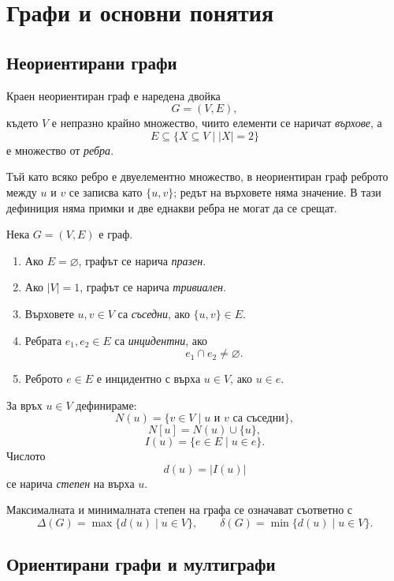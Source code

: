 \section{Графи и основни понятия}\label{s:3.2}

\subsection{Неориентирани графи}\label{s:3.2.1}

\begin{defn}
Краен неориентиран граф е наредена двойка
\[
G=(V,E),
\]
където $V$ е непразно крайно множество, чиито елементи се наричат \emph{върхове}, а
\[
E\subseteq\{X\subseteq V\mid |X|=2\}
\]
е множество от \emph{ребра}.
\end{defn}

Тъй като всяко ребро е двуелементно множество, в неориентиран граф реброто между $u$ и $v$ се записва като $\{u,v\}$; редът на върховете няма значение. В тази дефиниция няма примки и две еднакви ребра не могат да се срещат.

\begin{defn}
Нека $G=(V,E)$ е граф.
\begin{enumerate}
    \item Ако $E=\varnothing$, графът се нарича \emph{празен}.
    \item Ако $|V|=1$, графът се нарича \emph{тривиален}.
    \item Върховете $u,v\in V$ са \emph{съседни}, ако $\{u,v\}\in E$.
    \item Ребрата $e_1,e_2\in E$ са \emph{инцидентни}, ако
    \[
    e_1\cap e_2\neq\varnothing.
    \]
    \item Реброто $e\in E$ е инцидентно с върха $u\in V$, ако $u\in e$.
\end{enumerate}
\end{defn}

\begin{defn}
За връх $u\in V$ дефинираме:
\[
N(u)=\{v\in V\mid u\text{ и }v\text{ са съседни}\},
\]
\[
N[u]=N(u)\cup\{u\},
\]
\[
I(u)=\{e\in E\mid u\in e\}.
\]
Числото
\[
d(u)=|I(u)|
\]
се нарича \emph{степен} на върха $u$.
\end{defn}

Максималната и минималната степен на графа се означават съответно с
\[
\Delta(G)=\max\{d(u)\mid u\in V\},
\qquad
\delta(G)=\min\{d(u)\mid u\in V\}.
\]

\subsection{Ориентирани графи и мултиграфи}\label{s:3.2.2}

